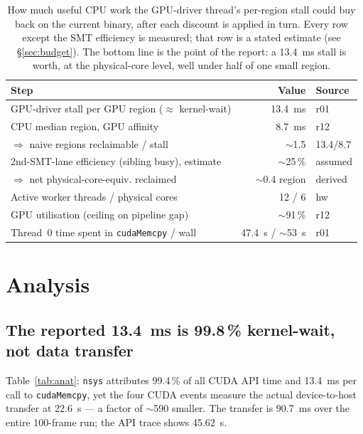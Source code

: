 \documentclass[
	english,
	letterpaper, oneside
]{article}
\begin{document}
\begin{table}[H]
    \centering
    \caption{How much useful CPU work the GPU-driver thread's per-region stall
             could buy back on the current binary, after each discount is
             applied in turn. Every row except the SMT efficiency is measured;
             that row is a stated estimate (see \S\ref{sec:budget}). The bottom
             line is the point of the report: a 13.4~ms stall is worth, at the
             physical-core level, well under half of one small region.}
    \label{tab:budget}
    \begin{tabular}{lrl}
        \hline
        Step & Value & Source \\
        \hline
        GPU-driver stall per GPU region ($\approx$ kernel-wait) & 13.4~ms & r01 \\
        CPU median region, GPU affinity                  & 8.7~ms  & r12 \\
        \quad $\Rightarrow$ naive regions reclaimable / stall   & $\sim$1.5 & 13.4/8.7 \\
        2nd-SMT-lane efficiency (sibling busy), estimate & $\sim$25\,\% & assumed \\
        \quad $\Rightarrow$ net physical-core-equiv. reclaimed  & $\sim$0.4 region & derived \\
        \hline
        Active worker threads / physical cores                  & 12 / 6  & hw \\
        GPU utilisation (ceiling on pipeline gap)               & $\sim$91\,\% & r12 \\
        Thread~0 time spent in \texttt{cudaMemcpy} / wall       & 47.4~s / $\sim$53~s & r01 \\
        \hline
    \end{tabular}
\end{table}

\section{Analysis}

\subsection{The reported 13.4~ms is 99.8\,\% kernel-wait, not data transfer}

Table~\ref{tab:anat}: \texttt{nsys} attributes 99.4\,\% of all CUDA API time and
13.4~ms per call to \texttt{cudaMemcpy}, yet the four CUDA events measure the
actual device-to-host transfer at 22.6~\textmu s --- a factor of
$\sim$590 smaller. The transfer is 90.7~ms over the entire 100-frame
run; the API trace shows 45.62~s.
\end{document}
